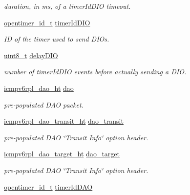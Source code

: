\begin{DoxyCompactItemize}
\begin{DoxyCompactList}\small\item\em duration, in ms, of a timer\+Id\+D\+IO timeout. \end{DoxyCompactList}\item 
\hyperlink{group___open_timers_gae5ca9e65d270cdfa4bc74008d96d69ab}{opentimer\+\_\+id\+\_\+t} \hyperlink{structicmpv6rpl__vars__t_a4720bd05e1417c23e0f25d1d5f8e5b83}{timer\+Id\+D\+IO}
\begin{DoxyCompactList}\small\item\em ID of the timer used to send D\+I\+Os. \end{DoxyCompactList}\item 
\hyperlink{_p_e___types_8h_aba7bc1797add20fe3efdf37ced1182c5}{uint8\+\_\+t} \hyperlink{structicmpv6rpl__vars__t_a9a63bf76729ecead4336da4d6390961b}{delay\+D\+IO}
\begin{DoxyCompactList}\small\item\em number of timer\+Id\+D\+IO events before actually sending a D\+IO. \end{DoxyCompactList}\item 
\hyperlink{structicmpv6rpl__dao__ht}{icmpv6rpl\+\_\+dao\+\_\+ht} \hyperlink{structicmpv6rpl__vars__t_ad908f36fc296bb65822d7839442a3bf2}{dao}
\begin{DoxyCompactList}\small\item\em pre-\/populated D\+AO packet. \end{DoxyCompactList}\item 
\hyperlink{structicmpv6rpl__dao__transit__ht}{icmpv6rpl\+\_\+dao\+\_\+transit\+\_\+ht} \hyperlink{structicmpv6rpl__vars__t_a8b709cb69b8a35bacb1f4b21def1e7cb}{dao\+\_\+transit}
\begin{DoxyCompactList}\small\item\em pre-\/populated D\+AO \char`\"{}\+Transit Info\char`\"{} option header. \end{DoxyCompactList}\item 
\hyperlink{structicmpv6rpl__dao__target__ht}{icmpv6rpl\+\_\+dao\+\_\+target\+\_\+ht} \hyperlink{structicmpv6rpl__vars__t_a0b59a4a59a1bd42737edc57f72d54d9d}{dao\+\_\+target}
\begin{DoxyCompactList}\small\item\em pre-\/populated D\+AO \char`\"{}\+Transit Info\char`\"{} option header. \end{DoxyCompactList}\item 
\hyperlink{group___open_timers_gae5ca9e65d270cdfa4bc74008d96d69ab}{opentimer\+\_\+id\+\_\+t} \hyperlink{structicmpv6rpl__vars__t_acfb6fe103149a40cb3644e81c70a7494}{timer\+Id\+D\+AO}

\end{DoxyCompactItemize}

